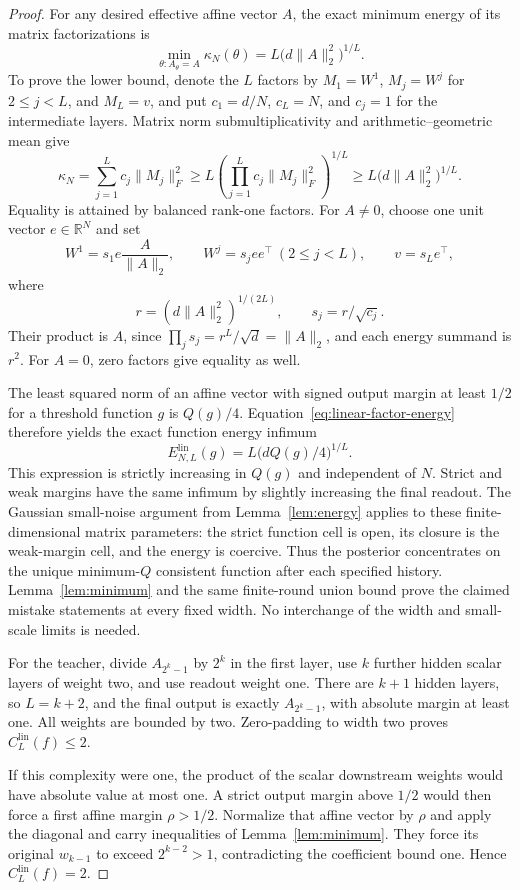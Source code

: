 \begin{proof}
For any desired effective affine vector $A$, the exact minimum energy
of its matrix factorizations is
\begin{equation}\label{eq:linear-factor-energy}
 \min_{\theta:A_\theta=A}\kappa_N(\theta)
       =L\bigl(d\|A\|_2^2\bigr)^{1/L}.
\end{equation}
To prove the lower bound, denote the $L$ factors by $M_1=W^1$,
$M_j=W^j$ for $2\le j<L$, and $M_L=v$, and put
$c_1=d/N$, $c_L=N$, and $c_j=1$ for the intermediate layers. Matrix norm
submultiplicativity and arithmetic--geometric mean give
\[
 \kappa_N=\sum_{j=1}^L c_j\|M_j\|_F^2
 \ge L\left(\prod_{j=1}^L c_j\|M_j\|_F^2\right)^{1/L}
 \ge L\bigl(d\|A\|_2^2\bigr)^{1/L}.
\]
Equality is attained by balanced rank-one factors. For $A\ne0$, choose
one unit vector $e\in\mathbb R^N$ and set
\[
 W^1=s_1e\frac{A}{\|A\|_2},\qquad
 W^j=s_j ee^\top\ (2\le j<L),\qquad v=s_Le^\top,
\]
where
\[
 r=(d\|A\|_2^2)^{1/(2L)},\qquad s_j=r/\sqrt{c_j}.
\]
Their product is $A$, since
$\prod_j s_j=r^L/\sqrt d=\|A\|_2$, and each energy summand is $r^2$.
For $A=0$, zero factors give equality as well.

The least squared norm of an affine vector with signed output margin
at least $1/2$ for a threshold function $g$ is $Q(g)/4$.
Equation~\eqref{eq:linear-factor-energy} therefore yields the exact
function energy infimum
\[
 E_{N,L}^{\mathrm{lin}}(g)
       =L\bigl(dQ(g)/4\bigr)^{1/L}.
\]
This expression is strictly increasing in $Q(g)$ and independent of
$N$. Strict and weak margins have the same infimum by slightly
increasing the final readout. The Gaussian small-noise argument from
Lemma~\ref{lem:energy} applies to these finite-dimensional matrix
parameters: the strict function cell is open, its closure is the
weak-margin cell, and the energy is coercive. Thus the posterior
concentrates on the unique minimum-$Q$ consistent function after each
specified history. Lemma~\ref{lem:minimum} and the same finite-round
union bound prove the claimed mistake statements at every fixed width.
No interchange of the width and small-scale limits is needed.

For the teacher, divide $A_{2^k-1}$ by $2^k$ in the first layer, use
$k$ further hidden scalar layers of weight two, and use readout weight
one. There are $k+1$ hidden layers, so $L=k+2$, and the final output is
exactly $A_{2^k-1}$, with absolute margin at least one. All weights are
bounded by two. Zero-padding to width two proves
$C_L^{\mathrm{lin}}(f)\le2$.

If this complexity were one, the product of the scalar downstream
weights would have absolute value at most one. A strict output margin
above $1/2$ would then force a first affine margin $\rho>1/2$.
Normalize that affine vector by $\rho$ and apply the diagonal and carry
inequalities of Lemma~\ref{lem:minimum}. They force its original
$w_{k-1}$ to exceed $2^{k-2}>1$, contradicting the coefficient bound
one. Hence $C_L^{\mathrm{lin}}(f)=2$.
\end{proof}

